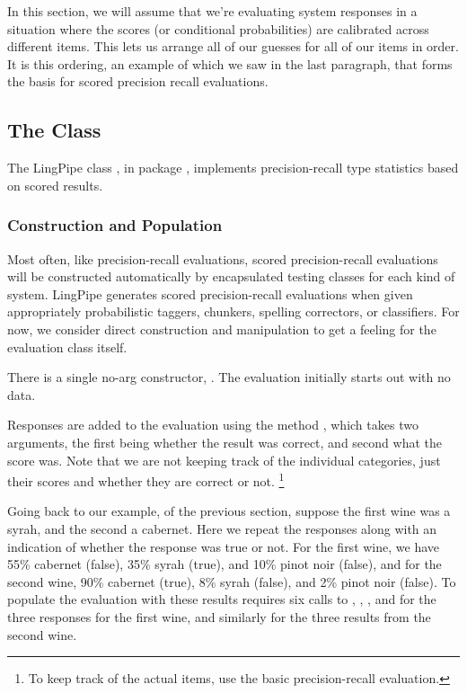 In this section, we will assume that we're evaluating system responses
in a situation where the scores (or conditional probabilities) are
calibrated across different items.  This lets us arrange all of our
guesses for all of our items in order.  It is this ordering, an example
of which we saw in the last paragraph, that forms the basis for
scored precision recall evaluations.

\subsection{The  Class}

The LingPipe class , in package
, implements precision-recall type
statistics based on scored results.  

\subsubsection{Construction and Population}

Most often, like precision-recall evaluations, scored precision-recall
evaluations will be constructed automatically by encapsulated testing
classes for each kind of system.  LingPipe generates scored
precision-recall evaluations when given appropriately probabilistic
taggers, chunkers, spelling correctors, or classifiers.  For now, we
consider direct construction and manipulation to get a feeling for the
evaluation class itself.

There is a single no-arg constructor,
.  The evaluation initially
starts out with no data.

Responses are added to the evaluation using the method
, which takes two arguments, the first
being whether the result was correct, and second what the score was.
Note that we are not keeping track of the individual categories, just
their scores and whether they are correct or not.%
%
\footnote{To keep track of the actual items, use the basic precision-recall
evaluation.}

Going back to our example, of the previous section, suppose the first
wine was a syrah, and the second a cabernet.  Here we repeat the
responses along with an indication of whether the response was true or
not.  For the first wine, we have 55\% cabernet (false), 35\% syrah
(true), and 10\% pinot noir (false), and for the second wine, 90\%
cabernet (true), 8\% syrah (false), and 2\% pinot noir (false).  To
populate the evaluation with these results requires six calls to
, ,
, and  for the three
responses for the first wine, and similarly for the three results from
the second wine.

